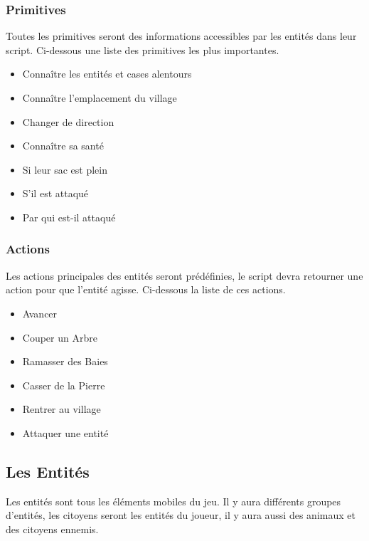 \documentclass[a4paper]{memoir}
\begin{document}
				\subsubsection{Primitives}
					Toutes les primitives seront des informations accessibles par les entités dans leur script. Ci-dessous une liste des primitives les plus importantes.
					\begin{itemize}[label=$\bullet$]
						\item Connaître les entités et cases alentours
						\item Connaître l'emplacement du village
						\item Changer de direction
						\item Connaître sa santé
						\item Si leur sac est plein
						\item S'il est attaqué
						\item Par qui est-il attaqué
					\end{itemize}
			
			
				\subsubsection{Actions}
					Les actions principales des entités seront prédéfinies, le script devra retourner une action pour que l'entité agisse. Ci-dessous la liste de ces actions.
					\begin{itemize}[label=$\bullet$]
						\item Avancer
						\item Couper un Arbre
						\item Ramasser des Baies
						\item Casser de la Pierre
						\item Rentrer au village
						\item Attaquer une entité
					\end{itemize}


			\subsection{Les Entités}
				Les entités sont tous les éléments mobiles du jeu. Il y aura différents groupes d'entités, les citoyens seront les entités du joueur, il y aura aussi des animaux et des citoyens ennemis.
\end{document}

